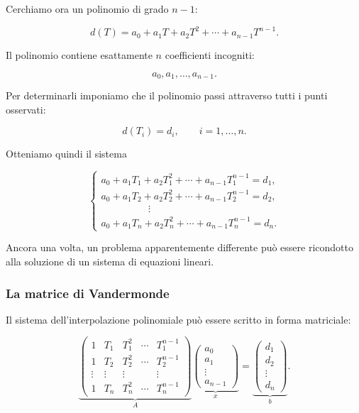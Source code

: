 Cerchiamo ora un polinomio di grado $n-1$:

\begin{equation*}
    d(T)
    =
    a_0+a_1T+a_2T^2+\cdots+a_{n-1}T^{n-1}.
    \label{eq:polynomial-interpolation}
\end{equation*}

Il polinomio contiene esattamente $n$ coefficienti incogniti:

\begin{equation*}
    a_0,a_1,\ldots,a_{n-1}.
\end{equation*}

Per determinarli imponiamo che il polinomio passi attraverso tutti i
punti osservati:

\begin{equation*}
    d(T_i)=d_i,
    \qquad i=1,\ldots,n.
\end{equation*}

Otteniamo quindi il sistema

\begin{equation*}
\begin{cases}
a_0+a_1T_1+a_2T_1^2+\cdots+a_{n-1}T_1^{n-1}=d_1,\\
a_0+a_1T_2+a_2T_2^2+\cdots+a_{n-1}T_2^{n-1}=d_2,\\
\hspace{2cm}\vdots\\
a_0+a_1T_n+a_2T_n^2+\cdots+a_{n-1}T_n^{n-1}=d_n.
\end{cases}
\end{equation*}

Ancora una volta, un problema apparentemente differente può essere
ricondotto alla soluzione di un sistema di equazioni lineari.


\subsubsection{La matrice di Vandermonde}

Il sistema dell'interpolazione polinomiale può essere scritto in
forma matriciale:

\begin{equation*}
\underbrace{
\begin{pmatrix}
1&T_1&T_1^2&\cdots&T_1^{n-1}\\
1&T_2&T_2^2&\cdots&T_2^{n-1}\\
\vdots&\vdots&\vdots&&\vdots\\
1&T_n&T_n^2&\cdots&T_n^{n-1}
\end{pmatrix}
}_{A}
\underbrace{
\begin{pmatrix}
a_0\\
a_1\\
\vdots\\
a_{n-1}
\end{pmatrix}
}_{x}
=
\underbrace{
\begin{pmatrix}
d_1\\
d_2\\
\vdots\\
d_n
\end{pmatrix}
}_{b}.
\label{eq:vandermonde-system}
\end{equation*}

